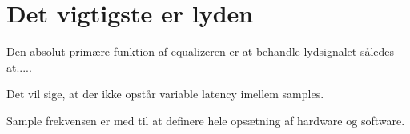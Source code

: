 \section{Det vigtigste er lyden}
Den absolut primære funktion af equalizeren er at behandle lydsignalet således at.....

Det vil sige, at der ikke opstår variable latency imellem samples.

Sample frekvensen er med til at definere hele opsætning af hardware og software.


